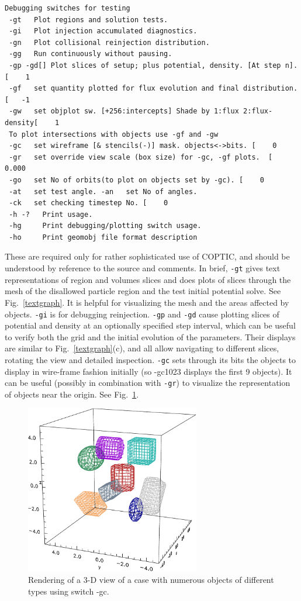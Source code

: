\documentclass[12pt]{article}
\begin{document}
\begin{verbatim}
Debugging switches for testing
 -gt   Plot regions and solution tests.
 -gi   Plot injection accumulated diagnostics.
 -gn   Plot collisional reinjection distribution.
 -gg   Run continuously without pausing.
 -gp -gd[] Plot slices of setup; plus potential, density. [At step n]. [    1
 -gf   set quantity plotted for flux evolution and final distribution. [   -1
 -gw   set objplot sw. [+256:intercepts] Shade by 1:flux 2:flux-density[    1
 To plot intersections with objects use -gf and -gw
 -gc   set wireframe [& stencils(-)] mask. objects<->bits. [    0
 -gr   set override view scale (box size) for -gc, -gf plots.  [   0.000
 -go   set No of orbits(to plot on objects set by -gc). [    0
 -at   set test angle. -an   set No of angles. 
 -ck   set checking timestep No. [    0
 -h -?   Print usage.
 -hg     Print debugging/plotting switch usage.
 -ho     Print geomobj file format description
\end{verbatim}
These are required only for rather sophisticated use of COPTIC, and
should be understood by reference to the source and comments. In
brief, \verb!-gt! gives text representations of region and volumes
slices and does plots of slices through the mesh of the disallowed
particle region and the test initial potential solve. See Fig.\
\ref{textgraph}. It is helpful for visualizing the mesh and the areas
affected by objects. \verb!-gi! is for debugging
reinjection. \verb!-gp! and \verb!-gd! cause plotting slices of
potential and density at an optionally specified step interval, which
can be useful to verify both the grid and the initial evolution of the
parameters. Their displays are similar to Fig.\ \ref{textgraph}(c),
and all allow navigating to different slices, rotating the view and
detailed inspection. \verb!-gc! sets through its bits the objects to
display in wire-frame fashion initially (so -gc1023 displays the first
9 objects). It can be useful (possibly in combination with \verb!-gr!) to
visualize the representation of objects near the origin. See Fig.\
\ref{manyobj}. 
\begin{figure}[htp]
  \centering
  \includegraphics[width=3in]{manyobj}
  \caption{Rendering of a 3-D view of a case with numerous objects of
    different types using switch -gc.\label{manyobj}}
\end{figure}
\end{document}
